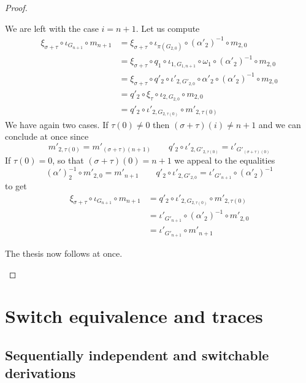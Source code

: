 \documentclass[a4paper]{article}
\theoremstyle{definition}
\begin{document}
\begin{proof}
\begin{itemize}
\begin{itemize}
	We are left with the case $i=n+1$. Let us compute
	\begin{align*}
		\xi_{\sigma+\tau}\circ \iota_{G_{n+1}} \circ m_{n+1} &= \xi_{\sigma+\tau} \circ \iota_{\pi(G_{2,0})} \circ (\alpha'_2)^{-1}\circ m_{2,0}\\&=\xi_{\sigma+\tau} \circ q_1\circ \iota_{1, G_{1,n+1}} \circ \omega_1 \circ (\alpha'_2)^{-1}\circ m_{2,0}\\&=\xi_{\sigma+\tau} \circ q'_2 \circ \iota'_{2,G'_{2,0}} \circ \alpha'_2 \circ (\alpha'_2)^{-1}\circ m_{2,0} \\&=q'_2 \circ \xi_\tau \circ \iota_{2, G_{2,0}} \circ m_{2,0}\\&=q'_2\circ \iota'_{2, G_{2,\tau(0)}} \circ m'_{2,\tau(0)}
	\end{align*}
	We have again two cases. If $\tau(0)\neq 0$ then $(\sigma+\tau)(i)\neq n+1$ and we can conclude at once since 
	\[m'_{2, \tau(0)}=m'_{(\sigma+\tau)(n+1)} \qquad q'_2\circ \iota'_{2, G'_{2,\tau(0)}}=
	\iota'_{G'_{(\sigma+\tau)(0)}}\] 
	If $\tau(0)=0$, so that  $(\sigma+\tau)(0)= n+1$ we appeal to the equalities
	\[(\alpha')^{-1}_2\circ m'_{2, 0}=m'_{n+1} \qquad q'_2\circ \iota'_{2, G'_{2, 0}}=
	\iota'_{G'_{n+1}}\circ (\alpha'_2)^{-1}\] 
	to get
	\begin{align*}
		\xi_{\sigma+\tau}\circ \iota_{G_{n+1}} \circ m_{n+1} &= q'_2\circ \iota'_{2, G_{2,\tau(0)}} \circ m'_{2,\tau(0)}\\&=	\iota'_{G'_{n+1}}\circ (\alpha'_2)^{-1}\circ m'_{2,0}\\&=\iota'_{G'_{n+1}}\circ  m'_{n+1}
	\end{align*}
\end{itemize}
The thesis now follows at once.	 \qedhere 
\end{itemize} \end{proof}







\section{Switch equivalence and traces}


\subsection{Sequentially independent and switchable derivations }
\end{document}
